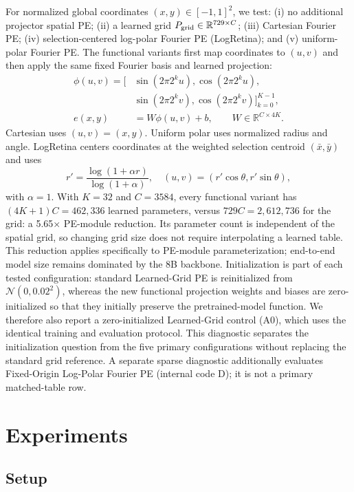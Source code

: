 \documentclass{article}
\begin{document}
For normalized global coordinates $(x,y)\in[-1,1]^2$, we test:
(i) no additional projector spatial PE;
(ii) a learned grid $P_{\rm grid}\in\mathbb{R}^{729\times C}$;
(iii) Cartesian Fourier PE; (iv) selection-centered log-polar
Fourier PE (LogRetina); and (v) uniform-polar Fourier PE.
The functional variants first map coordinates to $(u,v)$ and
then apply the same fixed Fourier basis and learned projection:
\begin{align}
 \phi(u,v)=\big[&\sin(2\pi2^ku),\cos(2\pi2^ku),\nonumber\\
                 &\sin(2\pi2^kv),\cos(2\pi2^kv)\big]_{k=0}^{K-1},\\
 e(x,y)&=W\phi(u,v)+b,\qquad W\in\mathbb{R}^{C\times4K}.
\end{align}
Cartesian uses $(u,v)=(x,y)$. Uniform polar uses normalized
radius and angle. LogRetina centers coordinates at the weighted
selection centroid $(\bar x,\bar y)$ and uses
\begin{equation}
 r'=\frac{\log(1+\alpha r)}{\log(1+\alpha)},\quad
 (u,v)=(r'\cos\theta,r'\sin\theta),
\end{equation}
with $\alpha=1$. With $K=32$ and $C=3584$, every functional
variant has $(4K+1)C=462{,}336$ learned parameters, versus
$729C=2{,}612{,}736$ for the grid: a 5.65$\times$ PE-module
reduction. Its parameter count is independent of the spatial
grid, so changing grid size does not require interpolating a
learned table. This reduction applies specifically to PE-module parameterization; end-to-end model size remains dominated by the 8B backbone.
Initialization is part of each tested configuration: standard Learned-Grid
PE is reinitialized from $\mathcal{N}(0,0.02^2)$, whereas the
new functional projection weights and biases are zero-initialized
so that they initially preserve the pretrained-model function.
We therefore also report a zero-initialized Learned-Grid control
(A0), which uses the identical training and evaluation protocol.
This diagnostic separates the initialization question from the
five primary configurations without replacing the standard grid
reference.
A separate sparse diagnostic additionally evaluates Fixed-Origin Log-Polar Fourier PE (internal code D); it is not a primary matched-table row.

\section{Experiments}

\subsection{Setup}
\end{document}
